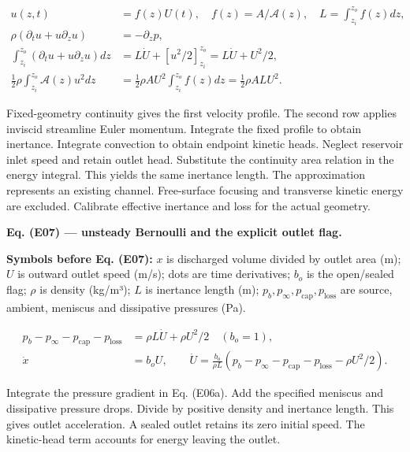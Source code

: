\documentclass[11pt]{article}
\begin{document}
\begin{equation*}
\begin{aligned}
u(z,t)&=f(z)U(t),\quad f(z)=A/\mathcal A(z),\quad L=\int_{z_i}^{z_o}f(z)dz,\\
\rho(\partial_tu+u\partial_zu)&=-\partial_zp,\\
\int_{z_i}^{z_o}(\partial_tu+u\partial_zu)dz
&=L\dot U+[u^2/2]_{z_i}^{z_o}=L\dot U+U^2/2,\\
\frac12\rho\int_{z_i}^{z_o}\mathcal A(z)u^2dz
&=\frac12\rho AU^2\int_{z_i}^{z_o}f(z)dz=\frac12\rho ALU^2.
\end{aligned}
\end{equation*}

Fixed-geometry continuity gives the first velocity profile. The second row applies inviscid streamline Euler momentum. Integrate the fixed profile to obtain inertance. Integrate convection to obtain endpoint kinetic heads. Neglect reservoir inlet speed and retain outlet head. Substitute the continuity area relation in the energy integral. This yields the same inertance length. The approximation represents an existing channel. Free-surface focusing and transverse kinetic energy are excluded. Calibrate effective inertance and loss for the actual geometry.


\textbf{Eq. (E07) — unsteady Bernoulli and the explicit outlet flag.}


\textbf{Symbols before Eq. (E07):} \(x\) is discharged volume divided by outlet area (m); \(U\) is outward outlet speed (m/s); dots are time derivatives; \(b_o\) is the open/sealed flag; \(\rho\) is density (kg/m³); \(L\) is inertance length (m); \(p_b,p_\infty,p_{\mathrm{cap}},p_{\mathrm{loss}}\) are source, ambient, meniscus and dissipative pressures (Pa).



\begin{equation*}
\begin{aligned}
p_b-p_\infty-p_{\mathrm{cap}}-p_{\mathrm{loss}}&=\rho L\dot U+\rho U^2/2\quad(b_o=1),\\
\dot x&=b_oU,\qquad
\dot U=\frac{b_o}{\rho L}(p_b-p_\infty-p_{\mathrm{cap}}-p_{\mathrm{loss}}-\rho U^2/2).
\end{aligned}
\end{equation*}

Integrate the pressure gradient in Eq. (E06a). Add the specified meniscus and dissipative pressure drops. Divide by positive density and inertance length. This gives outlet acceleration. A sealed outlet retains its zero initial speed. The kinetic-head term accounts for energy leaving the outlet.
\end{document}
